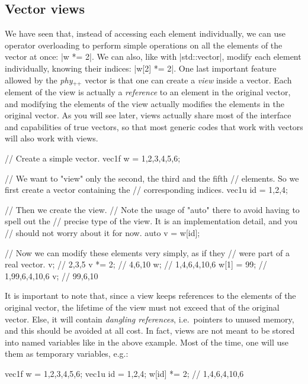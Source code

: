 \documentclass[12pt,a4paper]{report}
\newcommand{\phypp}{\textit{phy}$_{\text{++}}$\xspace}
\newcommand{\stdvec}{\cppinline|std::vector|\xspace}
\newenvironment{warning}
{
    \begin{mdframed}[style=warning,frametitle={Warning}]
}
{
    \end{mdframed}
}
\begin{document}
\subsection{Vector views \label{SEC:core:overview:views}}

We have seen that, instead of accessing each element individually, we can use operator overloading to perform simple operations on all the elements of the vector at once: \cppinline|w *= 2|. We can also, like with \stdvec, modify each element individually, knowing their indices: \cppinline|w[2] *= 2|. One last important feature allowed by the \phypp vector is that one can create a \emph{view} inside a vector. Each element of the view is actually a \emph{reference} to an element in the original vector, and modifying the elements of the view actually modifies the elements in the original vector. As you will see later, views actually share most of the interface and capabilities of true vectors, so that most generic codes that work with vectors will also work with views.

\begin{cppcode}
// Create a simple vector.
vec1f w = {1,2,3,4,5,6};

// We want to "view" only the second, the third and the fifth
// elements. So we first create a vector containing the
// corresponding indices.
vec1u id = {1,2,4};

// Then we create the view.
// Note the usage of "auto" there to avoid having to spell out the
// precise type of the view. It is an implementation detail, and you
// should not worry about it for now.
auto v = w[id];

// Now we can modify these elements very simply, as if they
// were part of a real vector.
v;         // {2,3,5}
v *= 2;    // {4,6,10}
w;         // {1,4,6,4,10,6}
w[1] = 99; // {1,99,6,4,10,6}
v;         // {99,6,10}
\end{cppcode}

\begin{warning}
It is important to note that, since a view keeps references to the elements of the original vector, the lifetime of the view must not exceed that of the original vector. Else, it will contain \emph{dangling references}, i.e.~pointers to unused memory, and this should be avoided at all cost. In fact, views are not meant to be stored into named variables like in the above example. Most of the time, one will use them as temporary variables, e.g.:
\begin{cppcode}
vec1f w = {1,2,3,4,5,6};
vec1u id = {1,2,4};
w[id] *= 2; // {1,4,6,4,10,6}
\end{cppcode}
\end{warning}
\end{document}

